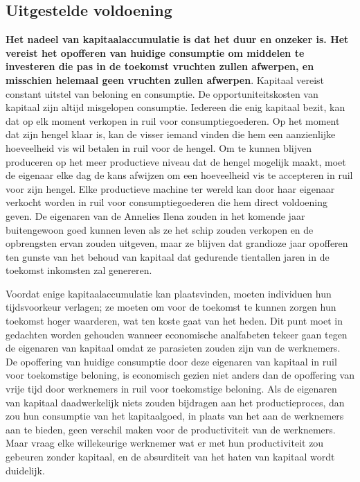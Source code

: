 \hypertarget{uitgestelde-voldoening}{%
\subsection{Uitgestelde voldoening}\label{uitgestelde-voldoening}}

\textbf{Het nadeel van kapitaalaccumulatie is dat het duur en onzeker is. Het vereist het opofferen van huidige consumptie om middelen te investeren die pas in de toekomst vruchten zullen afwerpen, en misschien helemaal geen vruchten zullen afwerpen}. Kapitaal vereist constant uitstel van beloning en consumptie. De opportuniteitskosten van kapitaal zijn altijd misgelopen consumptie. Iedereen die enig kapitaal bezit, kan dat op elk moment verkopen in ruil voor consumptiegoederen. Op het moment dat zijn hengel klaar is, kan de visser iemand vinden die hem een aanzienlijke hoeveelheid vis wil betalen in ruil voor de hengel. Om te kunnen blijven produceren op het meer productieve niveau dat de hengel mogelijk maakt, moet de eigenaar elke dag de kans afwijzen om een hoeveelheid vis te accepteren in ruil voor zijn hengel. Elke productieve machine ter wereld kan door haar eigenaar verkocht worden in ruil voor consumptiegoederen die hem direct voldoening geven. De eigenaren van de Annelies Ilena zouden in het komende jaar buitengewoon goed kunnen leven als ze het schip zouden verkopen en de opbrengsten ervan zouden uitgeven, maar ze blijven dat grandioze jaar opofferen ten gunste van het behoud van kapitaal dat gedurende tientallen jaren in de toekomst inkomsten zal genereren.

Voordat enige kapitaalaccumulatie kan plaatsvinden, moeten individuen hun tijdsvoorkeur verlagen; ze moeten om voor de toekomst te kunnen zorgen hun toekomst hoger waarderen, wat ten koste gaat van het heden. Dit punt moet in gedachten worden gehouden wanneer economische analfabeten tekeer gaan tegen de eigenaren van kapitaal omdat ze parasieten zouden zijn van de werknemers. De opoffering van huidige consumptie door deze eigenaren van kapitaal in ruil voor toekomstige beloning, is economisch gezien niet anders dan de opoffering van vrije tijd door werknemers in ruil voor toekomstige beloning. Als de eigenaren van kapitaal daadwerkelijk niets zouden bijdragen aan het productieproces, dan zou hun consumptie van het kapitaalgoed, in plaats van het aan de werknemers aan te bieden, geen verschil maken voor de productiviteit van de werknemers. Maar vraag elke willekeurige werknemer wat er met hun productiviteit zou gebeuren zonder kapitaal, en de absurditeit van het haten van kapitaal wordt duidelijk.

